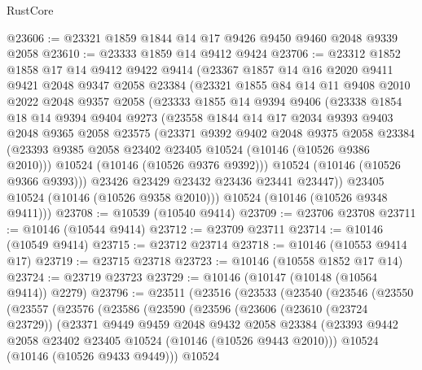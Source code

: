 \begin{lexlean}{RustCore}
\begin{coremodule}
@23606 := @23321 @1859 @1844 @14 @17 @9426 @9450 @9460 @2048 @9339 @2058
@23610 := @23333 @1859 @14 @9412 @9424
@23706 := @23312
    @1852
    @1858
    @17
    @14
    @9412
    @9422
    @9414
    (@23367
      @1857
      @14
      @16
      @2020
      @9411
      @9421
      @2048
      @9347
      @2058
      @23384
      (@23321
        @1855
        @84
        @14
        @11
        @9408
        @2010
        @2022
        @2048
        @9357
        @2058
        (@23333
          @1855
          @14
          @9394
          @9406
          (@23338
            @1854
            @18
            @14
            @9394
            @9404
            @9273
            (@23558
              @1844
              @14
              @17
              @2034
              @9393
              @9403
              @2048
              @9365
              @2058
              @23575
              (@23371
                @9392
                @9402
                @2048
                @9375
                @2058
                @23384
                (@23393 @9385 @2058 @23402 @23405 @10524 (@10146 (@10526 @9386 @2010)))
                @10524
                (@10146 (@10526 @9376 @9392)))
              @10524
              (@10146 (@10526 @9366 @9393)))
            @23426
            @23429
            @23432
            @23436
            @23441
            @23447))
        @23405
        @10524
        (@10146 (@10526 @9358 @2010)))
      @10524
      (@10146 (@10526 @9348 @9411)))
@23708 := @10539 (@10540 @9414)
@23709 := @23706 @23708
@23711 := @10146 (@10544 @9414)
@23712 := @23709 @23711
@23714 := @10146 (@10549 @9414)
@23715 := @23712 @23714
@23718 := @10146 (@10553 @9414 @17)
@23719 := @23715 @23718
@23723 := @10146 (@10558 @1852 @17 @14)
@23724 := @23719 @23723
@23729 := @10146 (@10147 (@10148 (@10564 @9414)) @2279)
@23796 := @23511
    (@23516
      (@23533
        (@23540
          (@23546
            (@23550
              (@23557
                (@23576
                  (@23586
                    (@23590
                      (@23596
                        (@23606
                          (@23610 (@23724 @23729))
                          (@23371
                            @9449
                            @9459
                            @2048
                            @9432
                            @2058
                            @23384
                            (@23393 @9442 @2058 @23402 @23405 @10524 (@10146 (@10526 @9443 @2010)))
                            @10524
                            (@10146 (@10526 @9433 @9449)))
                          @10524

\end{coremodule}
\end{lexlean}
